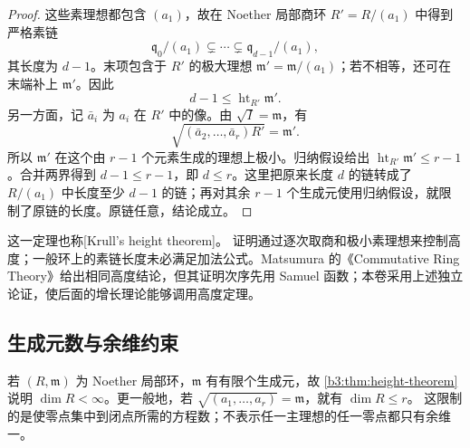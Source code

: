 \begin{proof}
	这些素理想都包含 \((a_1)\)，故在 Noether 局部商环 \(R'=R/(a_1)\) 中得到严格素链
	\[
		\mathfrak q_0/(a_1)\subsetneq\cdots\subsetneq\mathfrak q_{d-1}/(a_1),
	\]
	其长度为 \(d-1\)。末项包含于 \(R'\) 的极大理想 \(\mathfrak m'=\mathfrak m/(a_1)\)；若不相等，还可在末端补上 \(\mathfrak m'\)。因此
	\[
		d-1\le\operatorname{ht}_{R'}\mathfrak m'.
	\]
	另一方面，记 \(\bar a_i\) 为 \(a_i\) 在 \(R'\) 中的像。由 \(\sqrt I=\mathfrak m\)，有
	\[
		\sqrt{(\bar a_2,\ldots,\bar a_r)R'}=\mathfrak m'.
	\]
	所以 \(\mathfrak m'\) 在这个由 \(r-1\) 个元素生成的理想上极小。归纳假设给出 \(\operatorname{ht}_{R'}\mathfrak m'\le r-1\)。合并两界得到 \(d-1\le r-1\)，即 \(d\le r\)。这里把原来长度 \(d\) 的链转成了 \(R/(a_1)\) 中长度至少 \(d-1\) 的链；再对其余 \(r-1\) 个生成元使用归纳假设，就限制了原链的长度。原链任意，结论成立。
\end{proof}

这一定理也称[Krull's height theorem]。 证明通过逐次取商和极小素理想来控制高度；一般环上的素链长度未必满足加法公式。Matsumura 的《Commutative Ring Theory》给出相同高度结论\cite[Theorem 13.5, pp. 100--101]{Matsumura1989CommutativeRingTheory}，但其证明次序先用 Samuel 函数；本卷采用上述独立论证，使后面的增长理论能够调用高度定理。

\subsection{生成元数与余维约束}
\label{b3:subsec:0902:03}

若 \((R,\mathfrak m)\) 为 Noether 局部环，\(\mathfrak m\) 有有限个生成元，故 \cref{b3:thm:height-theorem}说明 \(\dim R<\infty\)。更一般地，若 \(\sqrt{(a_1,\ldots,a_r)}=\mathfrak m\)，就有 \(\dim R\le r\)。 这限制的是使零点集中到闭点所需的方程数；不表示任一主理想的任一零点都只有余维一。

